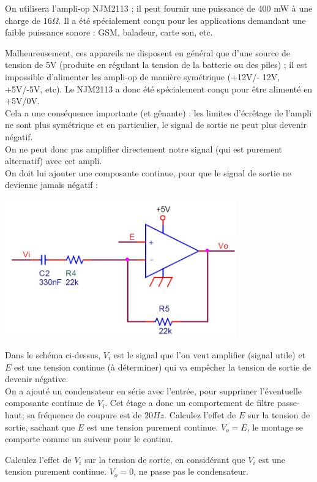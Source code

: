 On utilisera l'ampli-op NJM2113 ; il peut fournir une puissance de 400 mW à une charge de $16\Omega$. Il a été spécialement conçu pour les applications demandant une faible puissance sonore : GSM, baladeur, carte son, etc.

Malheureusement, ces appareils ne disposent en général que d'une source de tension de 5V (produite en régulant la tension de la batterie ou des piles) ; il est impossible d'alimenter les ampli-op de manière symétrique (+12V/- 12V, +5V/-5V, etc). Le NJM2113 a donc été spécialement conçu pour être alimenté en +5V/0V.\\
Cela a une conséquence importante (et gênante) : les limites d'écrêtage de l'ampli ne sont plus symétrique et en particulier, le signal de sortie ne peut plus devenir négatif.\\
On ne peut donc pas amplifier directement notre signal (qui est purement alternatif) avec cet ampli.\\
On doit lui ajouter une composante continue, pour que le signal de sortie ne devienne jamais négatif :
\begin{center}
\includegraphics[width=10cm]{figures/AOPetage3}
\end{center}

Dans le schéma ci-dessus, $V_i$ est le signal que l'on veut amplifier (signal utile) et $E$ est une tension continue (à déterminer) qui va empêcher la tension de sortie de devenir négative.\\
On a ajouté un condensateur en série avec l'entrée, pour supprimer l'éventuelle composante continue de $V_i$. Cet étage a donc un comportement de filtre passe-haut; sa fréquence de coupure est de $20Hz$.
{
Calculez l'effet de $E$ sur la tension de sortie, sachant que $E$ est une tension purement continue.
}
{$V_o = E$, le montage se comporte comme un suiveur pour le continu.}

{
Calculez l'effet de $V_i$ sur la tension de sortie, en considérant que $V_i$ est une tension purement continue.
}
{$V_o = 0$, ne passe pas le condensateur.}

